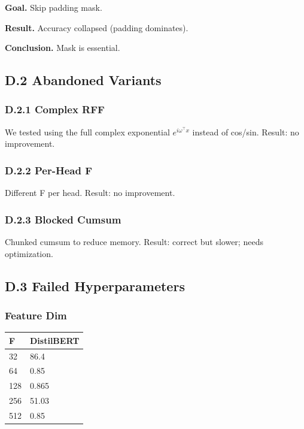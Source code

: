 \textbf{Goal.} Skip padding mask.

\textbf{Result.} Accuracy collapsed (padding dominates).

\textbf{Conclusion.} Mask is essential.

\subsection{D.2 Abandoned Variants}

\subsubsection{D.2.1 Complex RFF}

We tested using the full complex exponential $e^{i \omega^\top x}$ 
instead of cos/sin. Result: no improvement.

\subsubsection{D.2.2 Per-Head F}

Different F per head. Result: no improvement.

\subsubsection{D.2.3 Blocked Cumsum}

Chunked cumsum to reduce memory. Result: correct but slower; needs 
optimization.

\subsection{D.3 Failed Hyperparameters}

\subsubsection{Feature Dim}

\begin{table}[H]
\centering
\small
\begin{tabular}{ll}
\toprule
\textbf{F} & \textbf{DistilBERT} \\
\midrule
32 & 86.4 \\
64 & 0.85 \\
128 & 0.865 \\
256 & 51.03 \\
512 & 0.85 \\
\bottomrule
\end{tabular}
\end{table}

